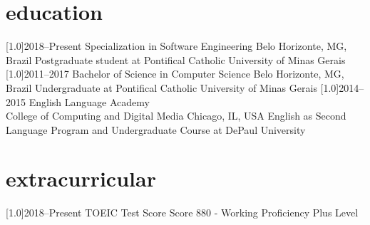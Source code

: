 \documentclass[portuguese]{cv-style}     %
\begin{document}
\section{education}
  \vspace{-0.2cm}
\begin{entrylist}
\entry
{\scalebox{.8}[1.0]{2018--Present}}
{Specialization in Software Engineering}
{Belo Horizonte, MG, Brazil}
{\small{Postgraduate student at Pontifical Catholic University of Minas Gerais}}
\entry
{\scalebox{.8}[1.0]{2011--2017}}
{Bachelor of Science in Computer Science}
{Belo Horizonte, MG, Brazil}
{\small{Undergraduate at Pontifical Catholic University of Minas Gerais}}
\entry
{\scalebox{.8}[1.0]{2014--2015}}
{English Language Academy\\ College of Computing and Digital Media}
{Chicago, IL, USA}
{\small{English as Second Language Program and Undergraduate Course at DePaul University}}
\end{entrylist}
\section{extracurricular}
 \vspace{-0.2cm}
\begin{entrylist}
\entry
{\scalebox{.8}[1.0]{2018--Present}}
{TOEIC Test Score}
{}
{Score 880 - Working Proficiency Plus Level}
\end{entrylist}
\vspace{-0.2cm}
\end{document}
